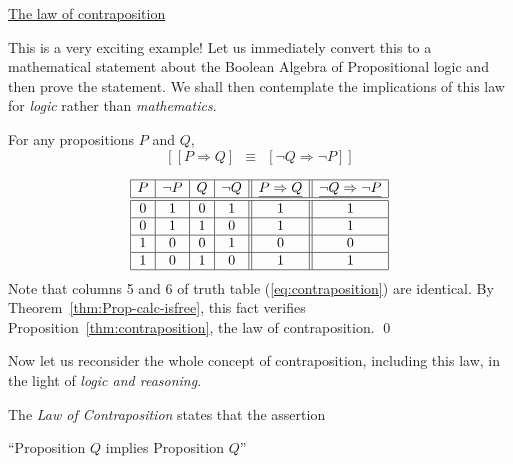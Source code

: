 \bigskip

\noindent 
\underline{\small\sf The law of contraposition}

\smallskip

\noindent
This is a very exciting example!  Let us immediately convert this to a mathematical statement about the Boolean Algebra of Propositional logic and then prove the statement.  We shall then contemplate the implications of this law for {\em logic} rather than {\em mathematics}.

\begin{prop}
\label{thm:contraposition}
For any propositions $P$ and $Q$,
\[  \left[ [ P \Rightarrow Q ] \ \ \equiv \ \ [ \neg Q
    \Rightarrow \neg P ] \right]
\]
\end{prop}

\begin{equation}
\label{eq:contraposition}
\begin{array}{|c|c|c|c||c||c|}
\hline
P & \neg P & Q & \neg Q & \underline{P \Rightarrow Q}
 & \underline{\neg Q \Rightarrow \neg P} \\
\hline
\hline
0 & 1 & 0 & 1 & 1 & 1 \\
\hline
0 & 1 & 1 & 0 & 1 & 1 \\
\hline
1 & 0 & 0 & 1 & 0 & 0 \\
\hline
1 & 0 & 1 & 0 & 1 & 1 \\
\hline
\end{array}
\end{equation}
Note that columns 5 and 6 of truth table (\ref{eq:contraposition}) are identical.  By Theorem~\ref{thm:Prop-calc-isfree}, this fact verifies Proposition~\ref{thm:contraposition}, the law of contraposition.  \qed

\smallskip

Now let us reconsider the whole concept of contraposition, including this law, in the light of {\em logic and reasoning}.

\medskip

The {\it Law of Contraposition} states that the assertion

\smallskip

\hspace*{.35in}
``Proposition $Q$ implies Proposition $Q$''

